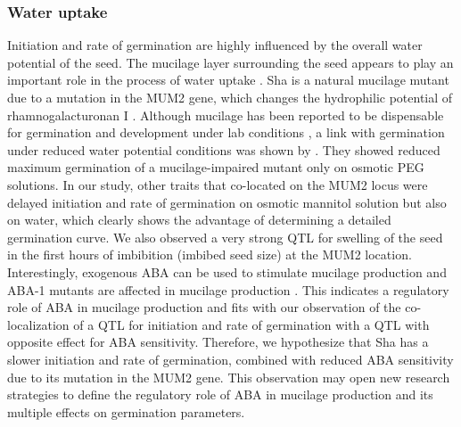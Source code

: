 \subsubsection{Water uptake}
Initiation and rate of germination are highly influenced by the overall water potential of the seed. The 
mucilage layer surrounding the seed appears to play an important role in the process of water uptake 
\cite{Penfield:2001}. Sha is a natural mucilage mutant due to a mutation in the MUM2 gene, which changes 
the hydrophilic potential of rhamnogalacturonan I \cite{Macquet:2007}. Although mucilage has been reported 
to be dispensable for germination and development under lab conditions \cite{Arsovski:2010}, a link with 
germination under reduced water potential conditions was shown by \cite{Penfield:2001}. They showed 
reduced maximum germination of a mucilage-impaired mutant only on osmotic PEG solutions. In our study, 
other traits that co-located on the MUM2 locus were delayed initiation and rate of germination on osmotic
mannitol solution but also on water, which clearly shows the advantage of determining a detailed 
germination curve. We also observed a very strong QTL for swelling of the seed in the first hours of 
imbibition (imbibed seed size) at the MUM2 location. Interestingly, exogenous ABA can be used to 
stimulate mucilage production and ABA-1 mutants are affected in mucilage production \cite{Karssen:1989}. 
This indicates a regulatory role of ABA in mucilage production and fits with our observation of the 
co-localization of a QTL for initiation and rate of germination with a QTL with opposite effect for ABA 
sensitivity. Therefore, we hypothesize that Sha has a slower initiation and rate of germination,
combined with reduced ABA sensitivity due to its mutation in the MUM2 gene. This observation may open 
new research strategies to define the regulatory role of ABA in mucilage production and its multiple 
effects on germination parameters.

